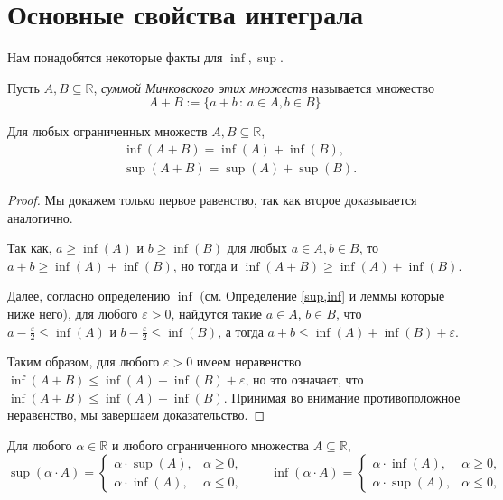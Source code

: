 \section{Основные свойства интеграла}

Нам понадобятся некоторые факты для $\inf, \sup$.

\begin{definition}
 Пусть $A,B \subseteq \mathbb{R}$, \textit{суммой Минковского этих множеств} называется множество
 \[
  A+B:=\{a+b\, :\, a\in A, b\in B\}
 \]
\end{definition}

\begin{lemma}\label{inf(A+B)}
    Для любых ограниченных множеств $A,B\subseteq \mathbb{R}$,
    \begin{align*}
        & \inf(A+B) = \inf(A) + \inf(B),\\
        & \sup(A+B) = \sup(A) + \sup(B).
    \end{align*}
\end{lemma}

\begin{proof}
Мы докажем только первое равенство, так как второе доказывается аналогично.

Так как, $a\ge \inf(A)$ и $b \ge \inf(B)$ для любых $a \in A, b\in B$, то $a+b \ge \inf(A) + \inf(B)$, но тогда и $\inf(A+B) \ge \inf(A) + \inf(B).$

Далее, согласно определению $\inf$ (см. Определение \ref{sup,inf} и леммы которые ниже него), для любого $\varepsilon>0$, найдутся такие $a\in A$, $b\in B$, что $a-\frac{\varepsilon}{2} \le \inf(A)$ и $b - \frac{\varepsilon}{2} \le \inf(B)$, а тогда $a+b \le \inf(A) + \inf(B) + \varepsilon$.

Таким образом, для любого $\varepsilon>0$ имеем неравенство $\inf(A+B) \le \inf(A) + \inf(B) + \varepsilon$, но это означает, что $\inf(A+B) \le \inf(A) + \inf(B)$. Принимая во внимание противоположное неравенство, мы завершаем доказательство.
\end{proof}

\begin{lemma}\label{sup(aA)}
    Для любого $\alpha \in \mathbb{R}$ и любого ограниченного множества $A \subseteq \mathbb{R}$,
    \[
     \sup(\alpha \cdot A) = \begin{cases}
         \alpha \cdot \sup(A), & \alpha \ge 0,\\
         \alpha \cdot \inf(A), & \alpha \le 0,
     \end{cases} \qquad  \inf(\alpha \cdot A) = \begin{cases}
         \alpha \cdot \inf(A), & \alpha \ge 0,\\
         \alpha \cdot \sup(A), & \alpha \le 0,
     \end{cases} 
    \]
\end{lemma}


